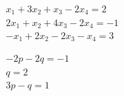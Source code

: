 \begin{exercise}
\begin{Parts}
\item\label{ex:syslciii} \(\begin{array}{l}
x_1+   3x_2+   x_3  -2x_4=   2\\
   2x_1+   x_2+   4x_3  -2x_4=  -1\\
  -x_1+   2x_2  -2x_3  -x_4=   3
\end{array}\)

\item\label{ex:syslciv} \(\begin{array}{l}
  -2p  -2q=  -1\\
      q=   2\\
   3p  -q=  1
\end{array}\)

\end{Parts}
\end{exercise}


